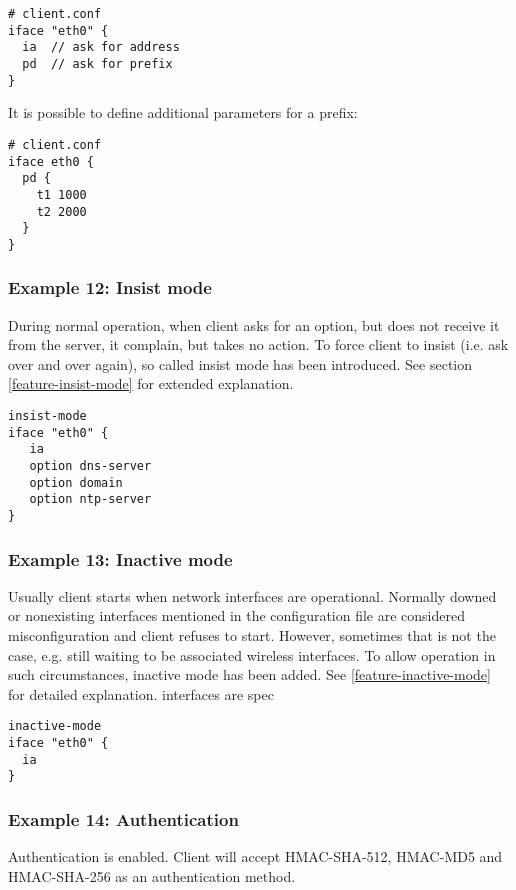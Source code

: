 \begin{lstlisting}
# client.conf
iface "eth0" {
  ia  // ask for address
  pd  // ask for prefix
}
\end{lstlisting}

It is possible to define additional parameters for a prefix:

\begin{lstlisting}
# client.conf
iface eth0 {
  pd {
    t1 1000
    t2 2000
  }
}
\end{lstlisting}

\subsubsection{Example 12: Insist mode}
\label{example-client-insistmode}
During normal operation, when client asks for an option, but does not
receive it from the server, it complain, but takes no action. To force
client to insist (i.e. ask over and over again), so called insist mode
has been introduced. See section \ref{feature-insist-mode} for
extended explanation.

\begin{lstlisting}
insist-mode
iface "eth0" {
   ia
   option dns-server
   option domain
   option ntp-server
}
\end{lstlisting}

\subsubsection{Example 13: Inactive mode}
\label{example-client-inactivemode}
Usually client starts when network interfaces are
operational. Normally downed or nonexisting interfaces mentioned in
the configuration file are considered misconfiguration and client
refuses to start. However, sometimes that is not the case, e.g. still
waiting to be associated wireless interfaces. To allow operation in
such circumstances, inactive mode has been added. See
\ref{feature-inactive-mode} for detailed explanation.
interfaces are spec

\begin{lstlisting}
inactive-mode
iface "eth0" {
  ia
}
\end{lstlisting}

\subsubsection{Example 14: Authentication}
\label{example-client-auth}
Authentication is enabled. Client will accept HMAC-SHA-512, HMAC-MD5
and HMAC-SHA-256 as an authentication method.

